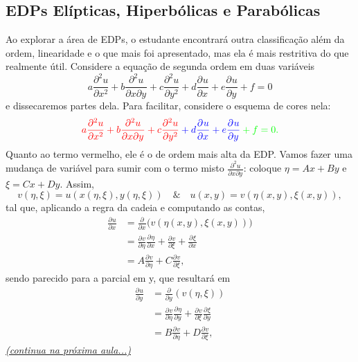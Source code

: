 \documentclass[../pde_notes.tex]{subfiles}
\begin{document}
\subsection{EDPs Elípticas, Hiperbólicas e Parabólicas}
Ao explorar a área de EDPs, o estudante encontrará outra classificação além da ordem, linearidade e o que mais foi apresentado, mas ela é mais restritiva do que realmente útil. Considere a equação de segunda ordem em duas variáveis
\[
	a \frac{\partial^{2}u}{\partial x^{2}} + b \frac{\partial^{2}u}{\partial x \partial y^{}} + c \frac{\partial^{2}u}{\partial y^{2}} + d \frac{\partial^{}u}{\partial x^{}} + e \frac{\partial^{}u}{\partial y^{}} + f = 0
\]
e dissecaremos partes dela. Para facilitar, considere o esquema de cores nela:
\[
	\color{red}a \frac{\partial^{2}u}{\partial x^{2}} + b \frac{\partial^{2}u}{\partial x \partial y^{}} + c \frac{\partial^{2}u}{\partial y^{2}} \color{blue}+ d \frac{\partial^{}u}{\partial x^{}} + e \frac{\partial^{}u}{\partial y^{}} \color{green} + f = 0.
\]
Quanto ao termo vermelho, ele é o de ordem mais alta da EDP. Vamos fazer uma mudança de variável para sumir com o termo misto \(\frac{\partial^{2}u}{\partial x \partial y^{}}\): coloque \(\eta = Ax + By\) e \(\xi = Cx + Dy\). Assim,
\[
	v(\eta , \xi ) = u(x(\eta , \xi ), y(\eta , \xi )) \quad\&\quad u(x, y) = v(\eta (x, y), \xi (x, y)),
\]
tal que, aplicando a regra da cadeia e computando as contas,
\begin{align*}
	\frac{\partial^{}u}{\partial x^{}} & = \frac{\partial^{}}{\partial x^{}}\bigl(v(\eta (x, y), \xi (x, y))\bigr)                                                                                      \\
	                                   & = \frac{\partial^{}v}{\partial \eta ^{}}\frac{\partial^{}\eta }{\partial x^{}} + \frac{\partial^{}v}{\partial \xi ^{}} + \frac{\partial^{}\xi }{\partial x^{}} \\
	                                   & = A \frac{\partial^{}v}{\partial \eta ^{}} + C \frac{\partial^{}v}{\partial \xi ^{}},
\end{align*}
sendo parecido para a parcial em y, que resultará em
\begin{align*}
	\frac{\partial^{}u}{\partial y^{}} & = \frac{\partial^{}}{\partial y^{}}(v(\eta, \xi ))                                                                                                          \\
	                                   & = \frac{\partial^{}v}{\partial \eta ^{}}\frac{\partial^{}\eta }{\partial y^{}} + \frac{\partial^{}v}{\partial \xi ^{}}\frac{\partial^{}\xi }{\partial y^{}} \\
	                                   & = B \frac{\partial^{}v}{\partial \eta ^{}} + D \frac{\partial^{}v}{\partial \xi ^{}},
\end{align*}
\hyperlink{nextclass1}{\textit{(continua na próxima aula...)}}
\end{document}
